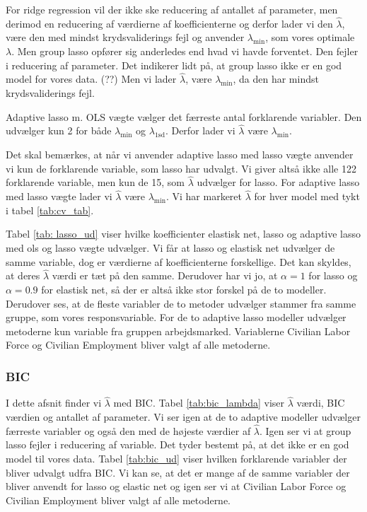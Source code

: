 For ridge regression vil der ikke ske reducering af antallet af parameter, men derimod en reducering af værdierne af koefficienterne og derfor lader vi den $\widehat{\lambda}$, være den med mindst krydsvaliderings fejl og anvender $\lambda_{\min}$, som vores optimale $\lambda$. 
%
Men group lasso opfører sig anderledes end hvad vi havde forventet. 
Den fejler i reducering af parameter. 
Det indikerer lidt på, at group lasso ikke er en god model for vores data. (??)
Men vi lader $\widehat{\lambda}$, være $\lambda_{\min}$, da den har mindst krydsvaliderings fejl. 

Adaptive lasso m. OLS vægte vælger det færreste antal forklarende variabler. 
Den udvælger kun 2 for både  $\lambda_{\min}$ og $\lambda_{1\text{sd}}$. 
Derfor lader vi $\widehat{\lambda}$ være $\lambda_{\min}$. 

Det skal bemærkes, at når vi anvender adaptive lasso med lasso vægte anvender vi kun de forklarende variable, som lasso har udvalgt. 
Vi giver altså ikke alle 122 forklarende variable, men kun de 15, som $\widehat{\lambda}$ udvælger for lasso.
For adaptive lasso med lasso vægte lader vi $\widehat{\lambda}$ være $\lambda_{\min}$.  
Vi har markeret $\widehat{\lambda}$ for hver model med tykt i tabel  \ref{tab:cv_tab}. 

Tabel \ref{tab: lasso_ud} viser hvilke koefficienter elastisk net, lasso og adaptive lasso med ols og lasso vægte udvælger. 
Vi får at lasso og elastisk net udvælger de samme variable, dog er værdierne af koefficienterne forskellige. 
Det kan skyldes, at deres $\widehat{\lambda}$ værdi er tæt på den samme. 
Derudover har vi jo, at $\alpha = 1$ for lasso og $\alpha = 0.9$ for elastisk net, så der er altså ikke stor forskel på de to modeller. 
Derudover ses, at de fleste variabler de to metoder udvælger stammer fra samme gruppe, som vores responsvariable.  
For de to adaptive lasso modeller udvælger metoderne kun variable fra gruppen arbejdsmarked. 
Variablerne Civilian Labor Force og Civilian Employment bliver valgt af alle metoderne. 



\newpage
\subsubsection{BIC}
I dette afsnit finder vi $\widehat{\lambda}$ med BIC. 
Tabel \ref{tab:bic_lambda} viser $\widehat{\lambda}$ værdi, BIC værdien og antallet af parameter. Vi ser igen at de to adaptive modeller udvælger færreste variabler og også den med de højeste værdier af $\widehat{\lambda}$. 
Igen ser vi at group lasso fejler i reducering af variable. Det tyder bestemt på, at det ikke er en god model til vores data. 
Tabel \ref{tab:bic_ud} viser hvilken forklarende variabler der bliver udvalgt udfra BIC. 
Vi kan se, at det er mange af de samme variabler der bliver anvendt for lasso og elastic net og igen ser vi at Civilian Labor Force og Civilian Employment bliver valgt af alle metoderne. 



